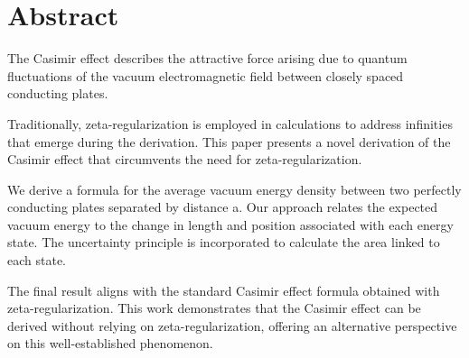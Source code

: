 
\section{Abstract}

The Casimir effect describes the attractive force arising due to quantum fluctuations of the vacuum electromagnetic field 
between closely spaced conducting plates. 

Traditionally, zeta-regularization is employed in calculations to address infinities that emerge during the derivation. 
This paper presents a novel derivation of the Casimir effect that circumvents the need for zeta-regularization.

We derive a formula for the average vacuum energy density between two perfectly conducting plates separated by distance a. 
Our approach relates the expected vacuum energy to the change in length and position associated with each energy state. 
The uncertainty principle is incorporated to calculate the area linked to each state. 

The final result aligns with the standard Casimir effect formula obtained with zeta-regularization. 
This work demonstrates that the Casimir effect can be derived without relying on zeta-regularization, 
offering an alternative perspective on this well-established phenomenon.